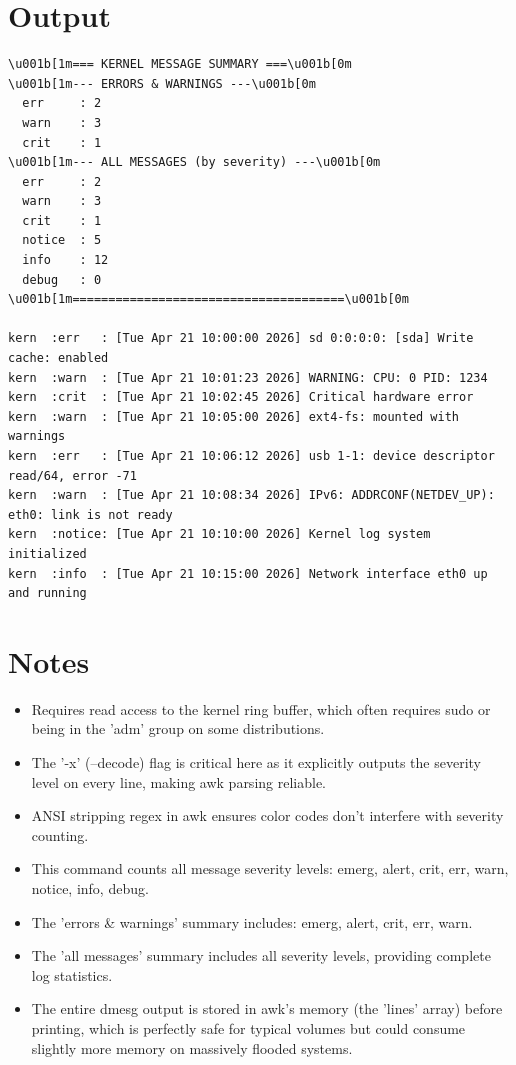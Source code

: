 \documentclass[openany]{book}
\begin{document}
\section*{Output}
\begin{lstlisting}
\u001b[1m=== KERNEL MESSAGE SUMMARY ===\u001b[0m
\u001b[1m--- ERRORS & WARNINGS ---\u001b[0m
  err     : 2
  warn    : 3
  crit    : 1
\u001b[1m--- ALL MESSAGES (by severity) ---\u001b[0m
  err     : 2
  warn    : 3
  crit    : 1
  notice  : 5
  info    : 12
  debug   : 0
\u001b[1m======================================\u001b[0m

kern  :err   : [Tue Apr 21 10:00:00 2026] sd 0:0:0:0: [sda] Write cache: enabled
kern  :warn  : [Tue Apr 21 10:01:23 2026] WARNING: CPU: 0 PID: 1234
kern  :crit  : [Tue Apr 21 10:02:45 2026] Critical hardware error
kern  :warn  : [Tue Apr 21 10:05:00 2026] ext4-fs: mounted with warnings
kern  :err   : [Tue Apr 21 10:06:12 2026] usb 1-1: device descriptor read/64, error -71
kern  :warn  : [Tue Apr 21 10:08:34 2026] IPv6: ADDRCONF(NETDEV_UP): eth0: link is not ready
kern  :notice: [Tue Apr 21 10:10:00 2026] Kernel log system initialized
kern  :info  : [Tue Apr 21 10:15:00 2026] Network interface eth0 up and running
\end{lstlisting}

\section*{Notes}
\begin{itemize}
  \item Requires read access to the kernel ring buffer, which often requires sudo or being in the 'adm' group on some distributions.
  \item The '-x' (--decode) flag is critical here as it explicitly outputs the severity level on every line, making awk parsing reliable.
  \item ANSI stripping regex in awk ensures color codes don't interfere with severity counting.
  \item This command counts all message severity levels: emerg, alert, crit, err, warn, notice, info, debug.
  \item The 'errors \& warnings' summary includes: emerg, alert, crit, err, warn.
  \item The 'all messages' summary includes all severity levels, providing complete log statistics.
  \item The entire dmesg output is stored in awk's memory (the 'lines' array) before printing, which is perfectly safe for typical volumes but could consume slightly more memory on massively flooded systems.
\end{itemize}
\end{document}
